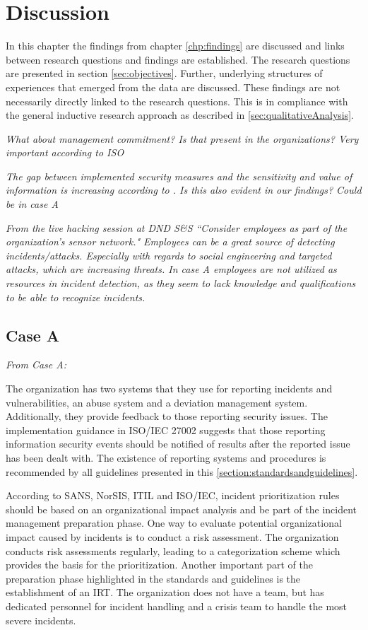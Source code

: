 \chapter{Discussion}
\label{chp:discussion}
In this chapter the findings from chapter \ref{chp:findings} are discussed and links between research questions and findings are established. The research questions are presented in section \ref{sec:objectives}. Further, underlying structures of experiences that emerged from the data are discussed. These findings are not necessarily directly linked to the research questions. This is in compliance with the general inductive research approach as described in \ref{sec:qualitativeAnalysis}.  



\textit{What about management commitment? Is that present in the organizations? Very important according to ISO}

\textit{The gap between implemented security measures and the sensitivity and value of information is increasing according to \cite{Morketall2012}. Is this also evident in our findings? Could be in case A}

\textit{From the live hacking session at DND S\&S ``Consider employees as part of the organization's sensor network." Employees can be a great source of detecting incidents/attacks. Especially with regards to social engineering and targeted attacks, which are increasing threats. In case A employees are not utilized as resources in incident detection, as they seem to lack knowledge and qualifications to be able to recognize incidents.}

\section{Case A}
\textit{From Case A:}

The organization has two systems that they use for reporting incidents and vulnerabilities, an abuse system and a deviation management system. Additionally, they provide feedback to those reporting security issues. The implementation guidance in ISO/IEC 27002 suggests that those reporting information security events should be notified of results after the reported issue has been dealt with. The existence of reporting systems and procedures is recommended by all guidelines presented in this \ref{section:standardsandguidelines}.

According to SANS, NorSIS, ITIL and ISO/IEC, incident prioritization rules should be based on an organizational impact analysis and be part of the incident management preparation phase. One way to evaluate potential organizational impact caused by incidents is to conduct a risk assessment. The organization conducts risk assessments regularly, leading to a categorization scheme which provides the basis for the prioritization. Another important part of the preparation phase highlighted in the standards and guidelines is the establishment of an \ac{IRT}. The organization does not have a team, but has dedicated personnel for incident handling and a crisis team to handle the most severe incidents.

